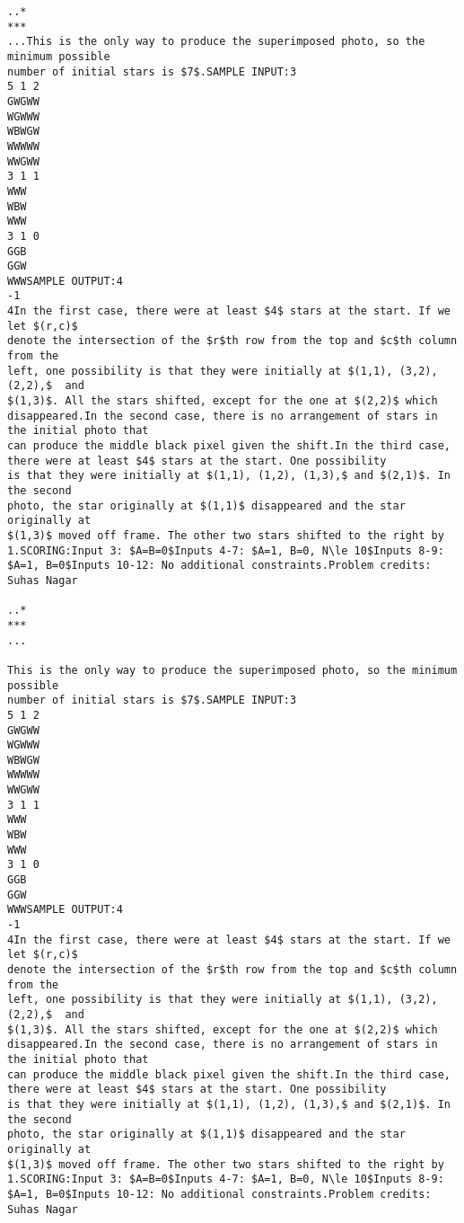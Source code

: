 \documentclass[12pt]{article}
\begin{document}
\begin{verbatim}
..*
***
...This is the only way to produce the superimposed photo, so the minimum possible
number of initial stars is $7$.SAMPLE INPUT:3
5 1 2
GWGWW
WGWWW
WBWGW
WWWWW
WWGWW
3 1 1
WWW
WBW
WWW
3 1 0
GGB
GGW
WWWSAMPLE OUTPUT:4
-1
4In the first case, there were at least $4$ stars at the start. If we let $(r,c)$
denote the intersection of the $r$th row from the top and $c$th column from the
left, one possibility is that they were initially at $(1,1), (3,2), (2,2),$  and
$(1,3)$. All the stars shifted, except for the one at $(2,2)$ which disappeared.In the second case, there is no arrangement of stars in the initial photo that
can produce the middle black pixel given the shift.In the third case, there were at least $4$ stars at the start. One possibility
is that they were initially at $(1,1), (1,2), (1,3),$ and $(2,1)$. In the second
photo, the star originally at $(1,1)$ disappeared and the star originally at
$(1,3)$ moved off frame. The other two stars shifted to the right by 1.SCORING:Input 3: $A=B=0$Inputs 4-7: $A=1, B=0, N\le 10$Inputs 8-9: $A=1, B=0$Inputs 10-12: No additional constraints.Problem credits: Suhas Nagar

..*
***
...

This is the only way to produce the superimposed photo, so the minimum possible
number of initial stars is $7$.SAMPLE INPUT:3
5 1 2
GWGWW
WGWWW
WBWGW
WWWWW
WWGWW
3 1 1
WWW
WBW
WWW
3 1 0
GGB
GGW
WWWSAMPLE OUTPUT:4
-1
4In the first case, there were at least $4$ stars at the start. If we let $(r,c)$
denote the intersection of the $r$th row from the top and $c$th column from the
left, one possibility is that they were initially at $(1,1), (3,2), (2,2),$  and
$(1,3)$. All the stars shifted, except for the one at $(2,2)$ which disappeared.In the second case, there is no arrangement of stars in the initial photo that
can produce the middle black pixel given the shift.In the third case, there were at least $4$ stars at the start. One possibility
is that they were initially at $(1,1), (1,2), (1,3),$ and $(2,1)$. In the second
photo, the star originally at $(1,1)$ disappeared and the star originally at
$(1,3)$ moved off frame. The other two stars shifted to the right by 1.SCORING:Input 3: $A=B=0$Inputs 4-7: $A=1, B=0, N\le 10$Inputs 8-9: $A=1, B=0$Inputs 10-12: No additional constraints.Problem credits: Suhas Nagar


\end{verbatim}
\end{document}

